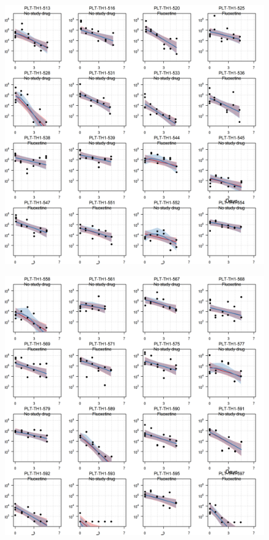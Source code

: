 \documentclass[
  letterpaper,
  DIV=11,
  numbers=noendperiod]{scrartcl}
\begin{document}
\begin{figure}[H]

{\centering \includegraphics{Fluoxetine_analysis_files/figure-pdf/individ_data-11.png}

}

\end{figure}

\begin{figure}[H]

{\centering \includegraphics{Fluoxetine_analysis_files/figure-pdf/individ_data-12.png}

}

\end{figure}
\end{document}
